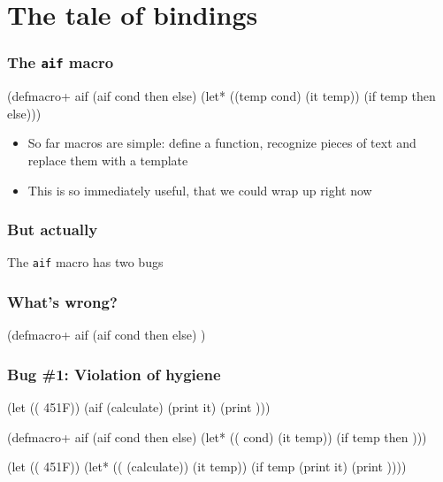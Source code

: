 \documentclass[hyperref={bookmarks=false}]{beamer}
\begin{document}
\section{The tale of bindings}

\begin{frame}[fragile]
\frametitle{The \texttt{aif} macro}
\begin{semiverbatim}
(defmacro+ aif
  (aif cond then else)
  (let* ((temp cond)
         (it temp))
    (if temp then else)))
\end{semiverbatim}

\begin{itemize}
\item So far macros are simple: define a function, recognize pieces of text and replace them with a template
\item This is so immediately useful, that we could wrap up right now
\end{itemize}
\end{frame}

\begin{frame}[fragile]
\frametitle{But actually}
The \texttt{aif} macro has two bugs
\end{frame}

\begin{frame}[fragile]
\frametitle{What's wrong?}
\begin{semiverbatim}

(defmacro+ aif
  (aif cond then else)
    )

\end{semiverbatim}
\end{frame}

\begin{frame}[fragile]
\frametitle{Bug \#1: Violation of hygiene}
\begin{semiverbatim}
(let ((\text{\color{blue}{temp}} 451{\textdegree}F))
  (aif (calculate)
    (print it)
    (print \text{\color{blue}{temp}})))

(defmacro+ aif
  (aif cond then else)
  (let* ((\text{\color{red}{temp}} cond)
         (it temp))
    (if temp then \text{\color{red}{else}})))

(let ((\text{\color{blue}{temp}} 451{\textdegree}F))
  (let* ((\text{\color{red}{temp}} (calculate))
         (it temp))
    (if temp
      (print it)
      (print \text{\color{red}{temp}}))))
\end{semiverbatim}
\end{frame}
\end{document}
